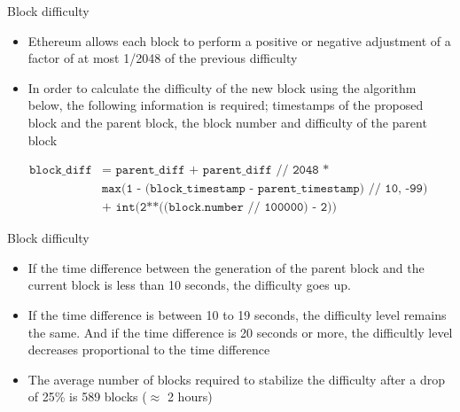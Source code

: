 \documentclass[11pt]{beamer}
\begin{document}
\begin{frame}{Block difficulty}
	\begin{itemize}
		\item Ethereum allows each block to perform a positive or negative adjustment of a factor of at most 1/2048 of the previous difficulty
		\item In order to calculate the difficulty of the new block using the algorithm below, the following information is required; timestamps of the proposed block and the parent block, the block number and difficulty of the parent block
	\end{itemize}
	\begin{centering}
		\begin{footnotesize}
			\begin{align*}
				 \texttt{block\_diff} & \texttt{= parent\_diff + parent\_diff // 2048 * }\\
				 &   \texttt{max(1 - (block\_timestamp - parent\_timestamp) // 10, -99) }\\
				 &   \texttt{+ int(2**((block.number // 100000) - 2))}
			\end{align*}
		\end{footnotesize}
	\end{centering}
\end{frame}


\begin{frame}{Block difficulty}
	\begin{itemize}
		\item If the time difference between the generation of the parent block and the current block is less than 10 seconds, the difficulty goes up.
		\item If the time difference is between 10 to 19 seconds, the difficulty level remains the same. And if the time difference is 20 seconds or more, the difficultly level decreases proportional to the time difference
		\item The average number of blocks required to stabilize the difficulty after a drop of 25\% is 589 blocks ($\approx$ 2 hours)
	\end{itemize}
\end{frame}

\end{document}
